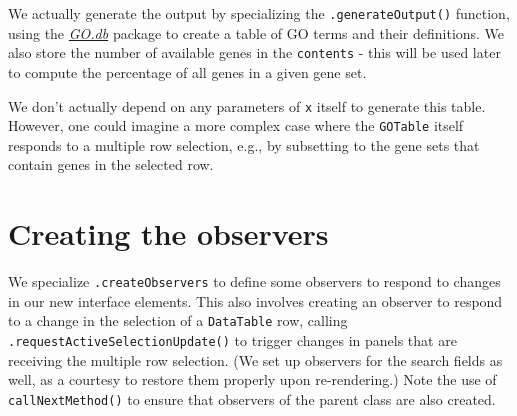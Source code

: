 \documentclass[
]{book}
\newenvironment{Shaded}{\begin{snugshade}}{\end{snugshade}}
\newcommand{\ControlFlowTok}[1]{\textcolor[rgb]{0.13,0.29,0.53}{\textbf{#1}}}
\newcommand{\DataTypeTok}[1]{\textcolor[rgb]{0.13,0.29,0.53}{#1}}
\newcommand{\KeywordTok}[1]{\textcolor[rgb]{0.13,0.29,0.53}{\textbf{#1}}}
\newcommand{\NormalTok}[1]{#1}
\newcommand{\OperatorTok}[1]{\textcolor[rgb]{0.81,0.36,0.00}{\textbf{#1}}}
\newcommand{\StringTok}[1]{\textcolor[rgb]{0.31,0.60,0.02}{#1}}
\begin{document}
We actually generate the output by specializing the \texttt{.generateOutput()} function,
using the \emph{\href{https://bioconductor.org/packages/3.11/GO.db}{GO.db}} package to create a table of GO terms and their definitions.
We also store the number of available genes in the \texttt{contents} -
this will be used later to compute the percentage of all genes in a given gene set.

\begin{Shaded}
\end{Shaded}

We don't actually depend on any parameters of \texttt{x} itself to generate this table.
However, one could imagine a more complex case where the \texttt{GOTable} itself responds to a multiple row selection,
e.g., by subsetting to the gene sets that contain genes in the selected row.

\hypertarget{creating-the-observers}{%
\section{Creating the observers}\label{creating-the-observers}}

We specialize \texttt{.createObservers} to define some observers to respond to changes in our new interface elements.
This also involves creating an observer to respond to a change in the selection of a \texttt{DataTable} row,
calling \texttt{.requestActiveSelectionUpdate()} to trigger changes in panels that are receiving the multiple row selection.
(We set up observers for the search fields as well, as a courtesy to restore them properly upon re-rendering.)
Note the use of \texttt{callNextMethod()} to ensure that observers of the parent class are also created.
\end{document}
